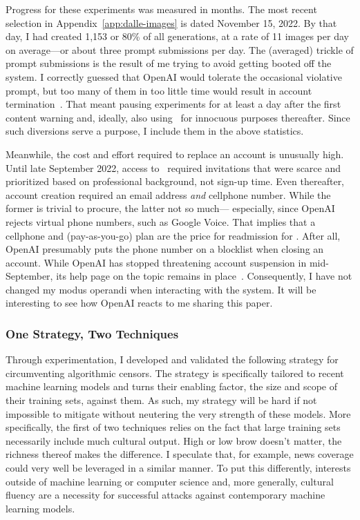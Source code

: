Progress for these experiments was measured in months. The most recent selection
in Appendix~\ref{app:dalle-images} is dated November 15, 2022. By
that day, I had created 1,153 or 80\% of all generations, at a rate of 11 images
per day on average---or about three prompt submissions per day. The (averaged)
trickle of prompt submissions is the result of me trying to avoid getting booted
off the system. I correctly guessed that OpenAI would tolerate the occasional
violative prompt, but too many of them in too little time would result in
account termination~\cite{SpicyElephant2022}. That meant pausing experiments for
at least a day after the first content warning and, ideally, also using \DALLE\
for innocuous purposes thereafter. Since such diversions serve a purpose, I
include them in the above statistics.

Meanwhile, the cost and effort required to replace an account is unusually high.
Until late September 2022, access to \DALLE\ required invitations that were
scarce and prioritized based on professional background, not sign-up time. Even
thereafter, account creation required an email address \emph{and} cellphone
number. While the former is trivial to procure, the latter not so much---%
especially, since OpenAI rejects virtual phone numbers, such as Google Voice.
That implies that a cellphone and (pay-as-you-go) plan are the price for
readmission for \DALLE. After all, OpenAI presumably puts the phone number on a
blocklist when closing an account. While OpenAI has stopped threatening account
suspension in mid-September, its help page on the topic remains in
place~\cite{Natalie2022}. Consequently, I have not changed my modus operandi
when interacting with the system. It will be interesting to see how OpenAI
reacts to me sharing this paper.


\subsubsection{One Strategy, Two Techniques}

Through experimentation, I developed and validated the following strategy for
circumventing algorithmic censors. The strategy is specifically tailored to
recent machine learning models and turns their enabling factor, the size and
scope of their training sets, against them. As such, my strategy will be hard if
not impossible to mitigate without neutering the very strength of these models.
More specifically, the first of two techniques relies on the fact that large
training sets necessarily include much cultural output. High or low brow doesn't
matter, the richness thereof makes the difference. I speculate that, for
example, news coverage could very well be leveraged in a similar manner. To put
this differently, interests outside of machine learning or computer science and,
more generally, cultural fluency are a necessity for successful attacks against
contemporary machine learning models.

